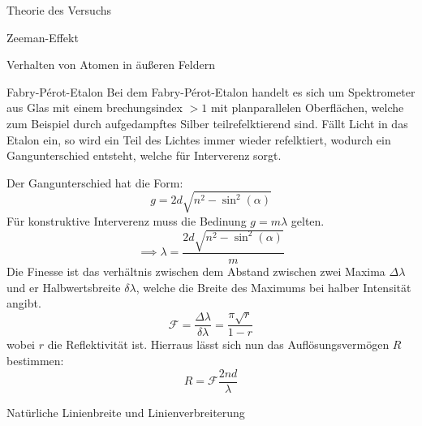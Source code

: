 \documentclass[pdftex, a4paper,11pt, twoside, ngerman]{report}
\begin{document}
\begin{chapter}{Theorie des Versuchs}
\begin{section}{Zeeman-Effekt}
\begin{subsection}{Verhalten von Atomen in äußeren Feldern}
      \end{subsection}
      
      
      
      \begin{subsection}{Fabry-Pérot-Etalon}
        Bei dem Fabry-Pérot-Etalon handelt es sich um Spektrometer aus Glas mit
        einem brechungsindex $>1$ mit planparallelen Oberflächen, welche zum
        Beispiel durch aufgedampftes Silber teilrefelktierend sind. Fällt Licht
        in das Etalon ein, so wird ein Teil des Lichtes immer wieder
        refelktiert, wodurch ein Gangunterschied entsteht, welche für
        Interverenz sorgt. 
        
        
        Der Gangunterschied hat die Form:
        \[
          g = 2d\sqrt{n^2-\sin^2(\alpha)}
        \]
        Für konstruktive Interverenz muss die Bedinung $g = m\lambda$ gelten.
        \[
          \implies \lambda = \frac{2d\sqrt{n^2-\sin^2(\alpha)}}m
        \]
        Die Finesse ist das verhältnis zwischen dem Abstand zwischen zwei
        Maxima $\Delta\lambda$ und er Halbwertsbreite $\delta\lambda$, welche
        die Breite des Maximums bei halber Intensität angibt.
        \[
          \mathcal{F}=\frac{\Delta\lambda}{\delta\lambda} = \frac{\pi\sqrt r}{1-r}
        \]
        wobei $r$ die Reflektivität ist.
        Hierraus lässt sich nun das Auflösungsvermögen $R$ bestimmen:
        \[
          R = \mathcal{F}\frac{2nd}{\lambda}
        \]
          
      \end{subsection}
      
      
      
      \begin{subsection}{Natürliche Linienbreite und Linienverbreiterung}
        
      \end{subsection}
      
      
      

\end{section}
\end{chapter}
\end{document}
